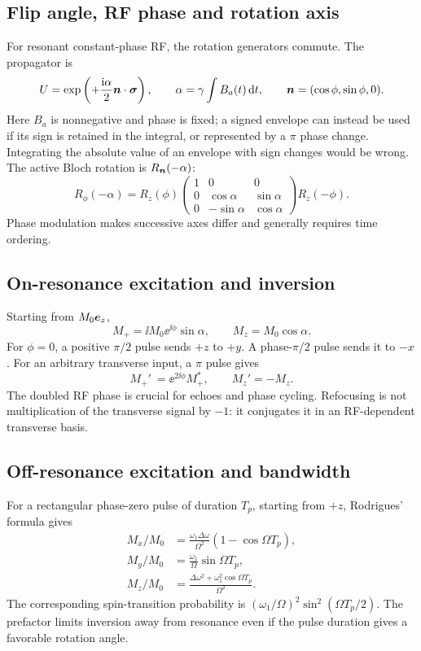 \subsection{Flip angle, RF phase and rotation axis}
For resonant constant-phase RF, the rotation generators commute.
The propagator is
\[
 U=\exp\left(+\frac{\mathrm{i}\alpha}{2}\bm{n}\cdot\bm{\sigma}\right),
 \qquad\alpha=\gamma\int B_a(t)\mathop{}\!\mathrm{d} t,\qquad
 \bm{n}=(\cos\phi,\sin\phi,0).
\]
Here $B_a$ is nonnegative and phase is fixed; a signed envelope can instead
be used if its sign is retained in the integral, or represented by a
$\pi$ phase change. Integrating the absolute value of an envelope with
sign changes would be wrong.
The active Bloch rotation is $R_{\bm{n}}(-\alpha)$:
\begin{equation}
 R_\phi(-\alpha)=R_z(\phi)
 \begin{pmatrix}1&0&0\\0&\cos\alpha&\sin\alpha\\
 0&-\sin\alpha&\cos\alpha\end{pmatrix}R_z(-\phi).
 \label{eq:04:rotation}
\end{equation}
Phase modulation makes successive axes differ and generally requires
time ordering.

\subsection{On-resonance excitation and inversion}
Starting from $M_0\bm{e}_z$,
\begin{equation}
 M_+=\ii M_0\ee^{\ii\phi}\sin\alpha,\qquad
 M_z=M_0\cos\alpha .
 \label{eq:04:tip}
\end{equation}
For $\phi=0$, a positive $\pi/2$ pulse sends $+z$ to $+y$.
A phase-$\pi/2$ pulse sends it to $-x$.
For an arbitrary transverse input, a $\pi$ pulse gives
\begin{equation}
 M_+'\ =\ee^{2\ii\phi}M_+^*,\qquad M_z'=-M_z.
 \label{eq:04:refocus}
\end{equation}
The doubled RF phase is crucial for echoes and phase cycling.
Refocusing is not multiplication of the transverse signal by $-1$:
it conjugates it in an RF-dependent transverse basis.

\subsection{Off-resonance excitation and bandwidth}
For a rectangular phase-zero pulse of duration $T_p$, starting from $+z$,
Rodrigues' formula gives
\begin{equation}
 \begin{split}
 M_x/M_0&=\frac{\omega_1\Delta\omega}{\Omega^2}
                       (1-\cos\Omega T_p),\\
 M_y/M_0&=\frac{\omega_1}{\Omega}\sin\Omega T_p,\\
 M_z/M_0&=\frac{\Delta\omega^2+\omega_1^2\cos\Omega T_p}{\Omega^2}.
 \end{split}
 \label{eq:04:detuned}
\end{equation}
The corresponding spin-transition probability is
$(\omega_1/\Omega)^2\sin^2(\Omega T_p/2)$.
The prefactor limits inversion away from resonance even if the pulse
duration gives a favorable rotation angle.

